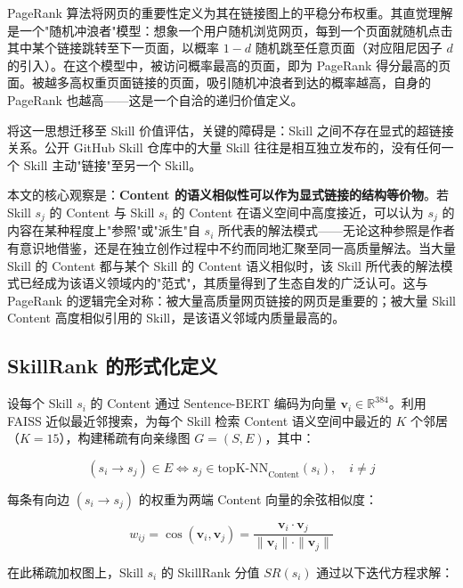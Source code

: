 PageRank 算法\cite{brin1998anatomy}将网页的重要性定义为其在链接图上的平稳分布权重。其直觉理解是一个"随机冲浪者"模型：想象一个用户随机浏览网页，每到一个页面就随机点击其中某个链接跳转至下一页面，以概率 $1-d$ 随机跳至任意页面（对应阻尼因子 $d$ 的引入）。在这个模型中，被访问概率最高的页面，即为 PageRank 得分最高的页面。被越多高权重页面链接的页面，吸引随机冲浪者到达的概率越高，自身的 PageRank 也越高——这是一个自洽的递归价值定义。

将这一思想迁移至 Skill 价值评估，关键的障碍是：Skill 之间不存在显式的超链接关系。公开 GitHub Skill 仓库中的大量 Skill 往往是相互独立发布的，没有任何一个 Skill 主动"链接"至另一个 Skill。

本文的核心观察是：\textbf{Content 的语义相似性可以作为显式链接的结构等价物}。若 Skill $s_j$ 的 Content 与 Skill $s_i$ 的 Content 在语义空间中高度接近，可以认为 $s_j$ 的内容在某种程度上"参照"或"派生"自 $s_i$ 所代表的解法模式——无论这种参照是作者有意识地借鉴，还是在独立创作过程中不约而同地汇聚至同一高质量解法。当大量 Skill 的 Content 都与某个 Skill 的 Content 语义相似时，该 Skill 所代表的解法模式已经成为该语义领域内的"范式"，其质量得到了生态自发的广泛认可。这与 PageRank 的逻辑完全对称：被大量高质量网页链接的网页是重要的；被大量 Skill Content 高度相似引用的 Skill，是该语义邻域内质量最高的。

\subsection{SkillRank 的形式化定义}

设每个 Skill $s_i$ 的 Content 通过 Sentence-BERT 编码为向量 $\mathbf{v}_i \in \mathbb{R}^{384}$。利用 FAISS 近似最近邻搜索，为每个 Skill 检索 Content 语义空间中最近的 $K$ 个邻居（$K=15$），构建稀疏有向亲缘图 $G = (S, E)$，其中：

\begin{equation}
    \label{eq:affinity_graph}
    (s_i \to s_j) \in E \iff s_j \in \mathrm{topK\text{-}NN}_{\mathrm{Content}}(s_i),\quad i \neq j
\end{equation}

每条有向边 $(s_i \to s_j)$ 的权重为两端 Content 向量的余弦相似度：

\begin{equation}
    \label{eq:edge_weight}
    w_{ij} = \cos(\mathbf{v}_i, \mathbf{v}_j) = \frac{\mathbf{v}_i \cdot \mathbf{v}_j}{\|\mathbf{v}_i\| \cdot \|\mathbf{v}_j\|}
\end{equation}

在此稀疏加权图上，Skill $s_i$ 的 SkillRank 分值 $SR(s_i)$ 通过以下迭代方程求解：

